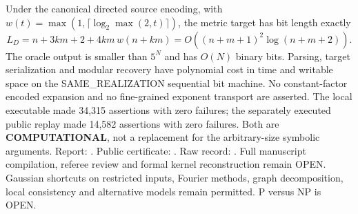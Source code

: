 \documentclass[11pt]{article}
\begin{document}
Under the canonical directed source encoding,
with $w(t)=\max(1,\lceil\log_2\max(2,t)\rceil)$,
the metric target has bit length exactly
\[
 L_D=n+3km+2+4km\,w(n+km)
 =O((n+m+1)^2\log(n+m+2)).
\]
The oracle output is smaller than $5^N$ and has $O(N)$
binary bits. Parsing, target serialization and modular
recovery have polynomial cost in time and writable space
on the SAME\_REALIZATION sequential bit machine. No
constant-factor encoded expansion and no fine-grained
exponent transport are asserted.
The local executable made 34,315 assertions with zero
failures; the separately executed public replay made
14,582 assertions with zero failures. Both are
\textbf{COMPUTATIONAL}, not a replacement for the
arbitrary-size symbolic arguments.
Report:
.
Public certificate:
.
Raw record:
.
Full manuscript compilation, referee review and formal kernel
reconstruction remain OPEN. Gaussian shortcuts on restricted
inputs, Fourier methods, graph decomposition, local consistency
and alternative models remain permitted. P versus NP is OPEN.
\end{document}
